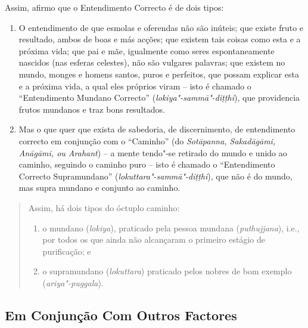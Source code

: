 Assim, afirmo que o Entendimento Correcto é de dois tipos:

\begin{enumerate}

  \item O entendimento de que esmolas e oferendas não são inúteis; que existe
        fruto e resultado, ambos de boas e más acções; que existem tais coisas
        como esta e a próxima vida; que pai e mãe, igualmente como seres
        espontaneamente nascidos (nas esferas celestes), não são vulgares
        palavras; que existem no mundo, monges e homens santos, puros e
        perfeitos, que possam explicar esta e a próxima vida, a qual eles
        próprios viram -- isto é chamado o “Entendimento Mundano Correcto”
        (\emph{lokiya"-sammā"-diṭṭhi}), que providencia frutos mundanos e traz
        bons resultados.

  \item Mas o que quer que exista de sabedoria, de discernimento, de
        entendimento correcto em conjunção com o “Caminho” (do
        \emph{Sotāpanna, Sakadāgāmi, Anāgāmi, ou Arahant}) -- a mente tendo"-se
        retirado do mundo e unido ao caminho, seguindo o caminho puro -- isto é
        chamado o “Entendimento Correcto Supramundano”
        (\emph{lokuttara"-sammā"-diṭṭhi}), que não é do mundo, mas supra mundano e
        conjunto ao caminho.

\end{enumerate}


\clearpage

\begin{quote}
  Assim, há dois tipos do óctuplo caminho:

  \begin{enumerate}
    \item o mundano (\emph{lokiya}), praticado pela pessoa mundana
          (\emph{puthujjana}), i.e., por todos os que ainda não alcançaram o
          primeiro estágio de purificação; e

    \item o supramundano (\emph{lokuttara}) praticado pelos nobres de bom
          exemplo (\emph{ariya"-puggala}).
  \end{enumerate}
\end{quote}

\subsection{Em Conjunção Com Outros Factores}

